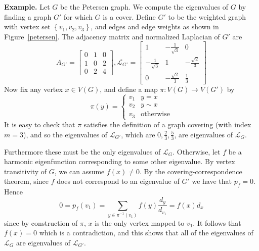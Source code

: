 \vspace*{1mm}
\noindent \textbf{Example.} Let $G$ be the Petersen graph.  We compute the eigenvalues of $G$ by finding a graph
$G'$ for which $G$ is a cover.  Define $G'$ to be the weighted graph with vertex set $\left\{ v_1, v_2, v_3\right\}$, 
and edges and edge weights as shown in Figure~\ref{petersen}.  The adjacency
matrix and normalized Laplacian of $G'$ are
 \[ A_{G'} = \begin{bmatrix}  0 & 1 & 0 \\
                             1 & 0 & 2 \\
                             0 & 2 & 4 \end{bmatrix},
   \mathcal{L}_{G'} = \begin{bmatrix} 1 & -\frac{1}{\sqrt{3}} & 0 \\
                             -\frac{1}{\sqrt{3}} & 1 & -\frac{\sqrt{2}}{3} \\
                             0 & -\frac{\sqrt{2}}{3} & \frac{1}{3} \end{bmatrix}
 \]  
Now fix any
vertex $x \in V(G)$, and define a map $\pi : V(G) \to V(G')$ by
 \[ \pi(y) = \begin{cases} 
      v_1 & y = x \\
      v_2 & y \sim x \\
      v_3 & \text{otherwise} 
   \end{cases}
\]
It is easy to check that $\pi$ satisfies the definition of a graph covering 
(with index $m=3$), and so the eigenvalues of
$\mathcal{L}_{G'}$, which are $0, \frac{2}{3}, \frac{5}{3}$, are eigenvalues of $\mathcal{L}_G$.


\noindent Furthermore these must be the only eigenvalues of $\mathcal{L}_G$.  Otherwise, let $f$ be a harmonic eigenfunction
corresponding to some other eigenvalue.  By vertex transitivity of $G$, we can
assume $f(x) \neq 0$.  By the covering-correspondence theorem, since 
$f$ does not correspond to an eigenvalue of $G'$ we have that
$p_f = 0$.  Hence
 \[ 0 = p_f(v_1) = \sum_{y \in \pi^{-1}(v_1)} f(y) \frac{d_y}{d_{v_1}} = f(x) d_x \]
since by construction of $\pi$,  $x$ is the only vertex mapped to $v_1$.  
It follows that $f(x)=0$ which is a contradiction, and this shows that
all of the eigenvalues of $\mathcal{L}_{G}$ are eigenvalues of $\mathcal{L}_{G'}$.

